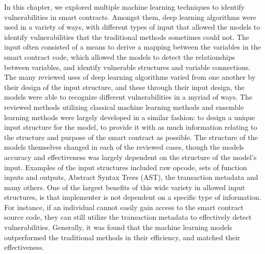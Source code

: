 In this chapter, we explored multiple machine learning techniques to identify vulnerabilities in smart contracts.
Amongst them, deep learning algorithms were used in a variety of ways, with different types of input that allowed the models to identify vulnerabilities that the traditional methods sometimes could not.
The input often consisted of a means to derive a mapping between the variables in the smart contract code, which allowed the models to detect the relationships between variables, and identify vulnerable structures and variable connections.
The many reviewed uses of deep learning algorithms varied from one another by their design of the input structure, and these through their input design, the models were able to recognize different vulnerabilities in a myriad of ways.
The reviewed methods utilizing classical machine learning methods and ensemble learning methods were largely developed in a similar fashion: to design a unique input structure for the model, to provide it with as much information relating to the structure and purpose of the smart contract as possible.
The structure of the models themselves changed in each of the reviewed cases, though the models accuracy and effectiveness was largely dependent on the structure of the model's input.
Examples of the input structures included raw opcode, sets of function inputs and outputs, Abstract Syntax Trees (AST), the transaction metadata and many others.
One of the largest benefits of this wide variety in allowed input structures, is that implementer is not dependent on a specific type of information.
For instance, if an individual cannot easily gain access to the smart contract source code, they can still utilize the transaction metadata to effectively detect vulnerabilities.
Generally, it was found that the machine learning models outperformed the traditional methods in their efficiency, and matched their effectiveness.

